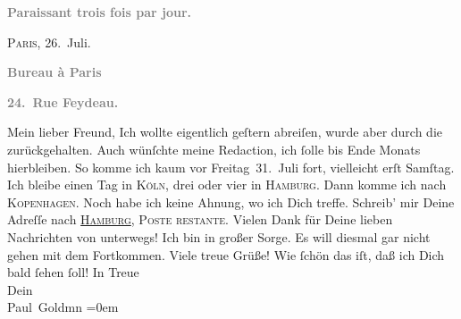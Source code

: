 \begin{ledgroupsized}[t]{13cm}
           \pstart
           \begin{otherlanguage}{french}\textcolor{gray}{\textbf{\textbf{Paraissant trois fois par jour.}}}\end{otherlanguage}\hfill \textsc{Paris}, 26. Juli.\pend
           \pstart
           \begin{otherlanguage}{french}\textcolor{gray}{\textbf{\textbf{Bureau à Paris}}}\end{otherlanguage}\pend
           \pstart
           \begin{otherlanguage}{french}\textcolor{gray}{\textbf{\textbf{24. Rue Feydeau.}}}\end{otherlanguage}\pend
           \pstart\center{}Mein lieber Freund,\pend\pstart
           Ich wollte eigentlich geſtern abreiſen, wurde aber
               durch die \label{K_L02783-1v}\label{K_L02783-1h} zurückgehalten. Auch wünſchte meine Redaction, ich ſolle bis Ende Monats hierbleiben. So komme ich kaum vor Freitag 31. Juli fort, vielleicht erſt Samſtag. Ich bleibe einen Tag in \textsc{Köln}, drei oder vier in \textsc{Hamburg}. Dann komme ich nach \textsc{Kopenhagen}. Noch habe ich keine Ahnung, wo {\pb}ich Dich
               treffe. Schreib’ mir Deine Adreſſe nach \textsc{\uline{Hamburg}}, \textsc{Poste restante}. Vielen Dank für Deine lieben
               Nachrichten von unterwegs! Ich bin in großer Sorge. Es will diesmal gar nicht gehen
               mit dem Fortkommen.\pend
           \pstart
           Viele treue Grüße!\pend
           \pstart
           Wie ſchön das iſt, daß ich Dich bald ſehen ſoll!\pend
           \pstart
           In Treue {\\[\baselineskip]}Dein {\\[\baselineskip]}\spacefill\mbox{Paul Goldmn}\pend
           \leftskip=0em{}
         
         \endnumbering{}\end{ledgroupsized}  \newcommand{\dateiname}{L02783}\newcommand{\titel}{Paul Goldmann an Arthur Schnitzler, 26. 7. [1896]}\newcommand{\editorInnen}{Martin Anton Müller und Laura Untner}
      